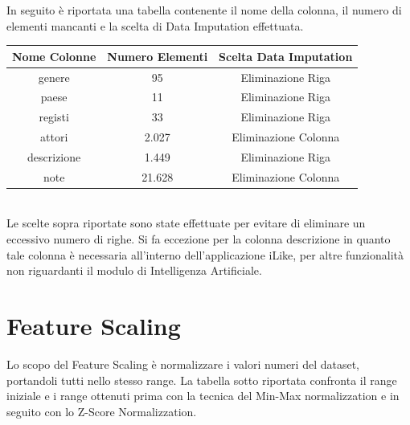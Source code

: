 \documentclass[a4paper, 12pt]{report}
\begin{document}
            In seguito è riportata una tabella contenente il nome della colonna, il numero di elementi mancanti e la scelta di
            Data Imputation effettuata.\\


            \begin{tabular}{ |c|c|c| }
                \hline \rowcolor{Goldenrod} Nome Colonne & Numero Elementi & Scelta Data Imputation \\
                \hline genere & 95 & Eliminazione Riga \\
                \hline paese & 11 & Eliminazione Riga \\
                \hline registi & 33 & Eliminazione Riga \\
                \hline attori & 2.027 & Eliminazione Colonna \\
                \hline descrizione & 1.449 & Eliminazione Riga \\
                \hline note & 21.628 & Eliminazione Colonna \\
                \hline
            \end{tabular}
            \\

            Le scelte sopra riportate sono state effettuate per evitare di eliminare un eccessivo numero di righe.
            Si fa eccezione per la colonna descrizione in quanto tale colonna è necessaria all'interno dell'applicazione
            iLike, per altre funzionalità non riguardanti il modulo di Intelligenza Artificiale.

        \section{Feature Scaling}\label{sec:feature-scaling}
            Lo scopo del Feature Scaling è normalizzare i valori numeri del dataset, portandoli tutti nello stesso range.
            La tabella sotto riportata confronta il range iniziale e i range ottenuti prima con la tecnica del Min-Max normalizzation
            e in seguito con lo Z-Score Normalizzation.
\end{document}
